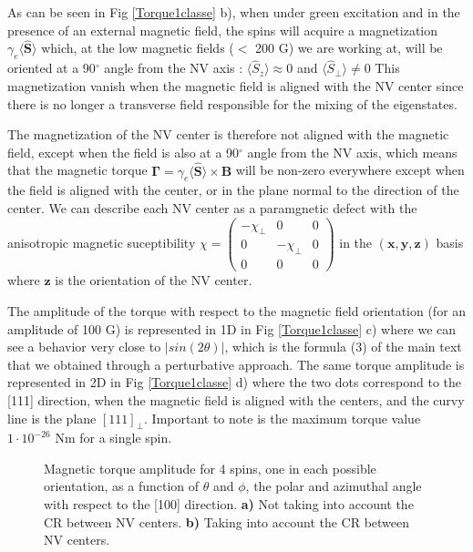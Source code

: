 \documentclass[preprintnumbers,amsmath,amssymb,onecolumn,12pt]{revtex4}
\begin{document}
As can be seen in Fig \ref{Torque1classe} b), when under green excitation and in the presence of an external magnetic field, the spins will acquire a magnetization $\gamma_e \langle\hat{\mathbf S}\rangle$ which, at the low magnetic fields ($<$ 200 G) we are working at, will be oriented at a 90$^\circ$ angle from the NV axis : $\langle \hat S_z \rangle \approx 0$ and $\langle \hat S_\perp \rangle \neq 0$ This magnetization vanish when the magnetic field is aligned with the NV center since there is no longer a transverse field responsible for the mixing of the eigenstates. 

The magnetization of the NV center is therefore not aligned with the magnetic field, except when the field is also at a 90$^\circ$ angle from the NV axis, which means that the magnetic torque $\mathbf \Gamma = \gamma_e \langle\hat{\mathbf S}\rangle \times \mathbf B $ will be non-zero everywhere except when the field is aligned with the center, or in the plane normal to the direction of the center. We can describe each NV center as a paramgnetic defect with the anisotropic magnetic suceptibility $\chi = \begin{pmatrix}-\chi_\perp & 0 & 0\\ 0 & -\chi_\perp & 0 \\ 0 & 0 & 0  \end{pmatrix}$ in the $(\mathbf{x},\mathbf{y},\mathbf{z})$ basis where $\mathbf{z}$ is the orientation of the NV center.

The amplitude of the torque with respect to the magnetic field orientation (for an amplitude of 100 G) is represented in 1D in Fig \ref{Torque1classe} c) where we can see a behavior very close to $|sin(2\theta)|$, which is the formula (3) of the main text that we obtained through a perturbative approach. The same torque amplitude is represented in 2D in Fig \ref{Torque1classe} d) where the two dots correspond to the [111] direction, when the magnetic field is aligned with the centers, and the curvy line is the plane $[111]_\perp$. Important to note is the maximum torque value $1\cdot 10^{-26}$ Nm for a single spin.

\begin{figure}[ht]
  \caption{Magnetic torque amplitude for 4 spins, one in each possible orientation, as a function of $\theta$ and $\phi$, the polar and azimuthal angle with respect to the [100] direction. \textbf{a)} Not taking into account the CR between NV centers. \textbf{b)} Taking into account the CR between NV centers.}
  		\label{Torque4classes}
\end{figure}
\end{document}
